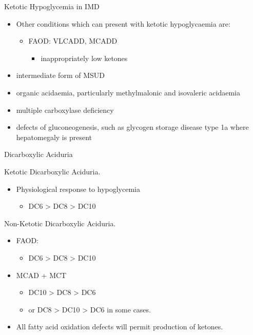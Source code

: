 \documentclass[presentation, smaller]{beamer}
\begin{document}
\begin{frame}[label={sec:orgheadline6}]{Ketotic Hypoglycemia in IMD}
\begin{itemize}
\item Other conditions which can present with ketotic hypoglycaemia are:
\begin{itemize}
\item FAOD: VLCADD, MCADD 
\begin{itemize}
\item inappropriately low ketones
\end{itemize}
\end{itemize}
\item intermediate form of MSUD
\item organic acidaemia, particularly methylmalonic and isovaleric acidaemia
\item multiple carboxylase deficiency
\item defects of gluconeogenesis, such as glycogen storage disease type
1a where hepatomegaly is present
\end{itemize}
\end{frame}

\begin{frame}[label={sec:orgheadline7}]{Dicarboxylic Aciduria}
\begin{block}{Ketotic Dicarboxylic Aciduria.}
\begin{itemize}
\item Physiological response to hypoglycemia
\begin{itemize}
\item DC6 > DC8 > DC10
\end{itemize}
\end{itemize}
\end{block}

\begin{block}{Non-Ketotic Dicarboxylic Aciduria.}
\begin{itemize}
\item FAOD:
\begin{itemize}
\item DC6 > DC8 > DC10
\end{itemize}
\item MCAD + MCT
\begin{itemize}
\item DC10 > DC8 > DC6
\item or DC8 > DC10 > DC6 in some cases.
\end{itemize}

\item All fatty acid oxidation defects will permit production of ketones.
\end{itemize}
\end{block}
\end{frame}
\end{document}

